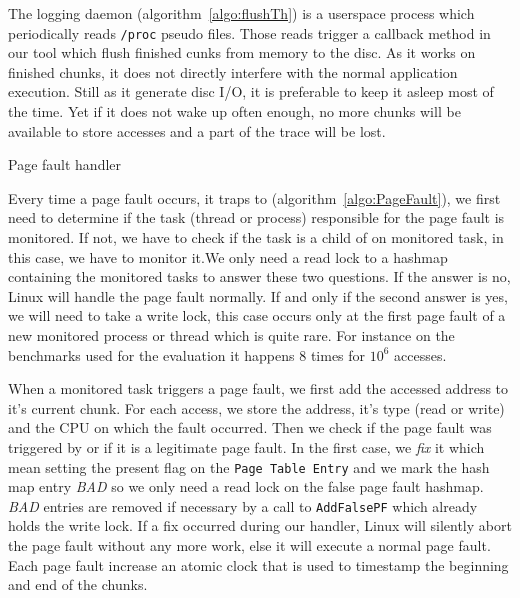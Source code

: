 The logging daemon (algorithm~\ref{algo:flushTh}) is a userspace process
which periodically reads \texttt{/proc} pseudo files. Those reads trigger a
callback method in our tool which flush finished cunks from memory to the
disc. As it works on finished chunks, it does not directly interfere with the
normal application execution. Still as it generate disc I/O, it is preferable to
keep it asleep most of the time. Yet if it does not wake up often enough, no
more chunks will be available to store accesses and a part of the trace will
be lost.

\begin{algorithm}[htb]
    \caption{Page fault handler}
    \label{algo:PageFault}
    \begin{algorithmic}[1]
                    \State \Return {}
                \EndIf
            \EndIf
            \State {}
            \State {}
            \State {}
            \State {}
            \State {}
            \State {}
        \EndFunction
    \end{algorithmic}
\end{algorithm}

Every time a page fault occurs, it traps to \Moca
(algorithm~\ref{algo:PageFault}), we first need to determine if the task
(thread or process) responsible for the page fault is
monitored. If not, we have to check if the task is a child of on monitored
task, in this case, we have to monitor it.We only need a read lock
to a hashmap containing the monitored tasks to answer these
two questions. If the answer is no, Linux will handle the page
fault normally. If and only if the second answer is yes, we will need to take
a write lock, this case occurs only at the first page fault of a new monitored
process or thread which is quite rare. For instance on the benchmarks used for
the evaluation it happens $8$ times for $10^6$ accesses.

When a monitored task triggers a page fault, we first add the accessed address
to it's current chunk. For each access, we store the address, it's type (read
or write) and the CPU on which the fault occurred.  Then we check if the page
fault was triggered by \Moca or if it is a legitimate page fault. In the first
case, we \emph{fix} it which mean setting the present flag on the \texttt{Page
Table Entry} and we mark the hash map entry \emph{BAD} so we only need a read
lock on the false page fault hashmap. \emph{BAD} entries are removed if
necessary by a call to \texttt{AddFalsePF} which already holds the write lock.
If a fix occurred during our handler, Linux will silently abort the page fault
without any more work, else it will execute a normal page fault. Each page
fault increase an atomic clock that is used to timestamp the beginning and end
of the chunks.

